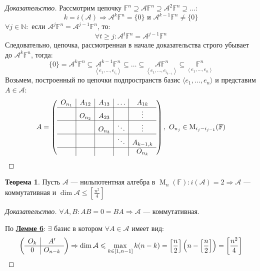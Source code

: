 \documentclass[a4paper, 14pt]{extarticle}
\theoremstyle{definition}
\newtheorem{theorem}{Теорема}
\begin{document}
\begin{proof}[Доказательство]
	Рассмотрим цепочку \(\mathbb{F}^n \supseteq \mathcal{A}\mathbb{F}^n \supseteq \mathcal{A}^2\mathbb{F}^n \supseteq \dots\):
	\[k = i(\mathcal{A}) \Rightarrow \mathcal{A}^k\mathbb{F}^n = \{0\} \text{ и } \mathcal{A}^{k - 1}\mathbb{F}^n \neq \{0\}\]
	\(\forall j \in \mathbb{N} : \) если \(\mathcal{A}^j\mathbb{F}^n = \mathcal{A}^{j - 1}\mathbb{F}^n\), то:
	\[\forall t \geqslant j : \mathcal{A}^t\mathbb{F}^n = \mathcal{A}^{j - 1}\mathbb{F}^n\]
	Следовательно, цепочка, рассмотренная в начале доказательства строго убывает до \(\mathcal{A}^k\mathbb{F}^n\), тогда:
	\[\{0\} = \mathcal{A}^k\mathbb{F}^n \subseteq \underset{\left\langle e_1, \dots, e_{i_1} \right\rangle}{\mathcal{A}^{k - 1}\mathbb{F}^n} \subseteq \dots \subseteq \underset{\left\langle e_1, \dots, e_{i_{k-1}} \right\rangle}{\mathcal{A}\mathbb{F}^n} \subseteq \underset{\left\langle e_1, \dots, e_{n} \right\rangle}{\mathbb{F}^n}\]
	Возьмем, построенный по цепочки подпространств базис \(\langle e_1, \dots, e_n\rangle\) и представим \(A \in \mathcal{A}\):
	\[A = \left(
		\begin{array}{c|c|c|c|c}
			O_{n_1} & A_{12} & A_{13} & \hdots & A_{1k} \\
			\hline 
			& O_{n_2} & A_{23} & & \vdots \\
			\hline 
			& & O_{n_3} & \ddots & \vdots\\
			\hline
			& & & \ddots & A_{k - 1, k} \\
			\hline
			& & & & O_{n_{k}}
		\end{array}
	\right),\ O_{n_j} \in \operatorname{M}_{i_j - i_{j - 1}}(\mathbb{F})\]
\end{proof}

\begin{theorem}\label{th5_2}
	Пусть \(\mathcal{A}\) --- нильпотентная алгебра в \(\operatorname{M}_n(\mathbb{F}): i(\mathcal{A}) = 2 \Rightarrow \mathcal{A}\) --- коммутативная и \(\operatorname{dim}\mathcal{A} \leqslant \left[ \frac{n^2}{4} \right]\)
\end{theorem}

\begin{proof}[Доказательство]
	\(\forall A, B: AB = 0 = BA \Rightarrow \mathcal{A}\) --- коммутативная.
	
	По \hyperref[lm5_1]{\textbf{Лемме 6}}: \(\exists\) базис в котором \(\forall A \in \mathcal{A}\) имеет вид:
	\[\left(
		\begin{array}{c|c}
			O_{k} & A^{\prime} \\
			\hline
			0 & O_{n - k}
		\end{array}
	\right) \Rightarrow \operatorname{dim}\mathcal{A} \leqslant \operatornamewithlimits{max}\limits_{k \in [1, n - 1]} k(n - k) = \left[ \frac{n}{2} \right] \left(n - \left[ \frac{n}{2} \right]\right) = \left[ \frac{n^2}{4} \right]\]
\end{proof}
\end{document}
